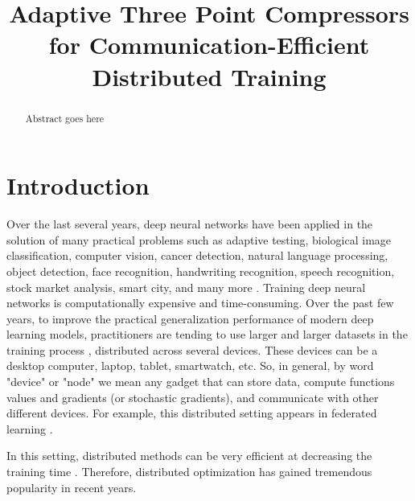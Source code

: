 \documentclass[nohyperref]{article}
\title{\bf Adaptive Three Point Compressors for Communication-Efficient Distributed Training}
\author{}
\date{}
\theoremstyle{plain}
\theoremstyle{definition}
\theoremstyle{remark}
\begin{document}
\maketitle


\begin{abstract}
Abstract goes here
\end{abstract}


\section{Introduction}

Over the last several years, deep neural networks \cite{goodfellow2016deep} have been applied in the solution of many practical problems such as adaptive testing, biological image classification, computer vision, cancer detection, natural language processing, object detection, face recognition, handwriting recognition, speech recognition, stock market analysis, smart city, and many more \cite{dargan2020survey}. 
Training deep neural networks is computationally expensive and time-consuming. Over the past few years, to improve the practical generalization performance of modern deep learning models, practitioners are tending to use larger and larger datasets in the training process \cite{vaswani2019fast}, 
distributed across several devices. These devices can be a desktop computer, laptop, tablet, smartwatch, etc. So, in general, by word "device" or "node" we mean any gadget that can store data, compute functions values and gradients (or stochastic gradients), and communicate with other different devices. 
For example, this distributed setting appears in federated learning \cite{konevcny2016federated, mcmahan2017communication}.

In this setting, distributed methods can be very efficient at decreasing the training time \cite{goyal2017accurate, you2019large}. Therefore, distributed optimization has gained tremendous popularity in recent years.
\end{document}
